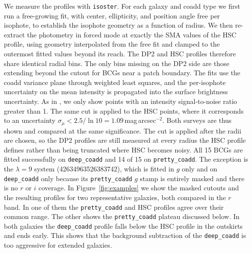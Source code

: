 \documentclass[SE,lsstdraft,authoryear,toc]{lsstdoc}
\begin{document}
We measure the profiles with \texttt{isoster}. For each galaxy and coadd type we first run a free-growing fit, with center, ellipticity, and position angle free per isophote, to establish the isophote geometry as a function of radius. We then re-extract the photometry in forced mode at exactly the SMA values of the HSC profile, using geometry interpolated from the free fit and clamped to the outermost fitted values beyond its reach. The DP2 and HSC profiles therefore share identical radial bins. The only bins missing on the DP2 side are those extending beyond the cutout for BCGs near a patch boundary. The fits use the coadd variance plane through weighted least squares, and the per-isophote uncertainty on the mean intensity is propagated into the surface brightness uncertainty. As in , we only show points with an intensity signal-to-noise ratio greater than 1. The same cut is applied to the HSC points, where it corresponds to an uncertainty $\sigma_\mu < 2.5/\ln 10 = 1.09$\,mag\,arcsec$^{-2}$. Both surveys are thus shown and compared at the same significance. The cut is applied after the radii are chosen, so the DP2 profiles are still measured at every radius the HSC profile defines rather than being truncated where HSC becomes noisy. All 15 BCGs are fitted successfully on \texttt{deep\_coadd} and 14 of 15 on \texttt{pretty\_coadd}. The exception is the $\lambda = 9$ system (42634963526383742), which is fitted in $g$ only and on \texttt{deep\_coadd} only because its \texttt{pretty\_coadd} $g$ stamp is entirely masked and there is no $r$ or $i$ coverage. In Figure~\ref{fig:examples} we show the masked cutouts and the resulting profiles for two representative galaxies, both compared in the $r$ band. In one of them the \texttt{pretty\_coadd} and HSC profiles agree over their common range. The other shows the \texttt{pretty\_coadd} plateau discussed below. In both galaxies the \texttt{deep\_coadd} profile falls below the HSC profile in the outskirts and ends early. This shows that the background subtraction of the \texttt{deep\_coadd} is too aggressive for extended galaxies.
\end{document}
